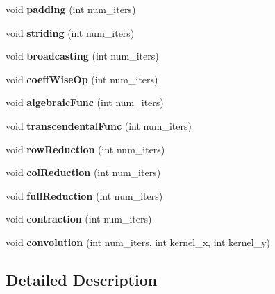 \begin{DoxyCompactItemize}
void {\bfseries padding} (int num\+\_\+iters)
\item 
\mbox{\label{class_benchmark_suite_a42047753fd9853ff243739811c9f145e}} 
void {\bfseries striding} (int num\+\_\+iters)
\item 
\mbox{\label{class_benchmark_suite_a6c5e0aef280fbded77b7c792715a34f2}} 
void {\bfseries broadcasting} (int num\+\_\+iters)
\item 
\mbox{\label{class_benchmark_suite_a4c50732f7d23e075225a0e6864d24d12}} 
void {\bfseries coeff\+Wise\+Op} (int num\+\_\+iters)
\item 
\mbox{\label{class_benchmark_suite_a89d7913590aaec7d04bc6662f246a0ea}} 
void {\bfseries algebraic\+Func} (int num\+\_\+iters)
\item 
\mbox{\label{class_benchmark_suite_a5a93f86f9df9d99de1d63db8e5f0b85b}} 
void {\bfseries transcendental\+Func} (int num\+\_\+iters)
\item 
\mbox{\label{class_benchmark_suite_a54d4004f67f2f52bb37886c7a3095225}} 
void {\bfseries row\+Reduction} (int num\+\_\+iters)
\item 
\mbox{\label{class_benchmark_suite_a207ac9706067b08800f3f478a719f274}} 
void {\bfseries col\+Reduction} (int num\+\_\+iters)
\item 
\mbox{\label{class_benchmark_suite_a80ac0e92f7d973f3fa24da7fc85582c3}} 
void {\bfseries full\+Reduction} (int num\+\_\+iters)
\item 
\mbox{\label{class_benchmark_suite_a4e60940b0962859e6bf020bf4f25676f}} 
void {\bfseries contraction} (int num\+\_\+iters)
\item 
\mbox{\label{class_benchmark_suite_ae613f9d381021dc15dad6c86f55ee19b}} 
void {\bfseries convolution} (int num\+\_\+iters, int kernel\+\_\+x, int kernel\+\_\+y)
\end{DoxyCompactItemize}


\subsection{Detailed Description}
